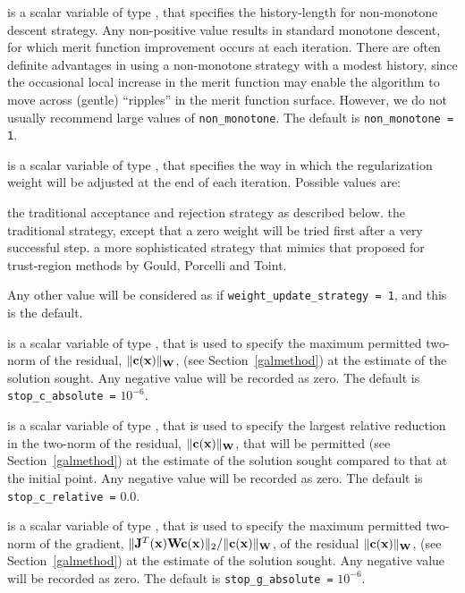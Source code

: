 \documentclass{galahad}
\begin{document}
\begin{description}
 is a scalar variable of type \integer, that
specifies the history-length for non-monotone descent strategy.
Any non-positive value results in standard monotone descent, for which
merit function improvement occurs at each iteration. There are often
definite advantages in using a non-monotone strategy with a modest history,
since the occasional local increase in the merit function may
enable the algorithm to move across (gentle) ``ripples'' in
the merit function surface.
However, we do not usually recommend large values of {\tt non\_monotone}.
The default is {\tt non\_monotone = 1}.

 is a scalar variable of type \integer,
that specifies the way in which the regularization weight will be adjusted
at the end of each iteration. Possible values are:
\begin{description}
 the traditional acceptance and rejection strategy as described below.
 the traditional strategy, except that a zero weight will be tried
first after a very successful step.
 a more sophisticated strategy that mimics that proposed
for trust-region methods by Gould, Porcelli and Toint.
\end{description}
Any other value will be considered as if {\tt weight\_update\_strategy = 1},
and this is the default.

 is a scalar variable of type \realdp,
that is used to specify the maximum permitted two-norm of the
residual, $\|{\mathbf{c}}({\mathbf{x}})\|_{{\mathbf{W}}}$,
(see Section~\ref{galmethod}) at the estimate of the solution sought.
Any negative value will be recorded as zero.
The default is {\tt stop\_c\_absolute =} $10^{-6}$.

 is a scalar variable of type \realdp,
that is used to specify the largest relative reduction in the two-norm of the
residual, $\|{\mathbf{c}}({\mathbf{x}})\|_{{\mathbf{W}}}$, that will be permitted
(see Section~\ref{galmethod}) at the estimate of the solution sought
compared to that at the initial point.
Any negative value will be recorded as zero.
The default is {\tt stop\_c\_relative =} $0.0$.

 is a scalar variable of type \realdp,
that is used to specify the maximum permitted two-norm of the gradient,
 $\|{\mathbf{J}}^T({\mathbf{x}}) {\mathbf{W}} {\mathbf{c}}({\mathbf{x}})\|_2/\|{\mathbf{c}}({\mathbf{x}})\|_{{\mathbf{W}}}$,
of the residual  $\|{\mathbf{c}}({\mathbf{x}})\|_{{\mathbf{W}}}$,
(see Section~\ref{galmethod}) at the estimate of the solution sought.
Any negative value will be recorded as zero.
The default is {\tt stop\_g\_absolute =} $10^{-6}$.


\end{description}
\end{document}
